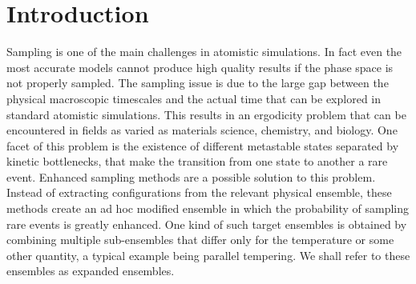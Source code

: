 \documentclass[aps,prx,reprint,superscriptaddress]{revtex4-1} %
\begin{document}
%


\section{Introduction}
Sampling is one of the main challenges in atomistic simulations.
In fact even the most accurate models cannot produce high quality results if the phase space is not properly sampled.
The sampling issue is due to the large gap between the physical macroscopic timescales and the actual time that can be explored in standard atomistic simulations.
This results in an ergodicity problem that can be encountered in fields as varied as materials science, chemistry, and biology.
One facet of this problem is the existence of different metastable states separated by kinetic bottlenecks, that make the transition from one state to another a rare event.
Enhanced sampling methods are a possible solution to this problem.
Instead of extracting configurations from the relevant physical ensemble, these methods create an ad hoc modified ensemble in which the probability of sampling rare events is greatly enhanced.
One kind of such target ensembles is obtained by combining multiple sub-ensembles that differ only for the temperature or some other quantity, a typical example being parallel tempering\cite{Earl2005}.
We shall refer to these ensembles as expanded ensembles\cite{Lyubartsev1992}. 
\end{document}
